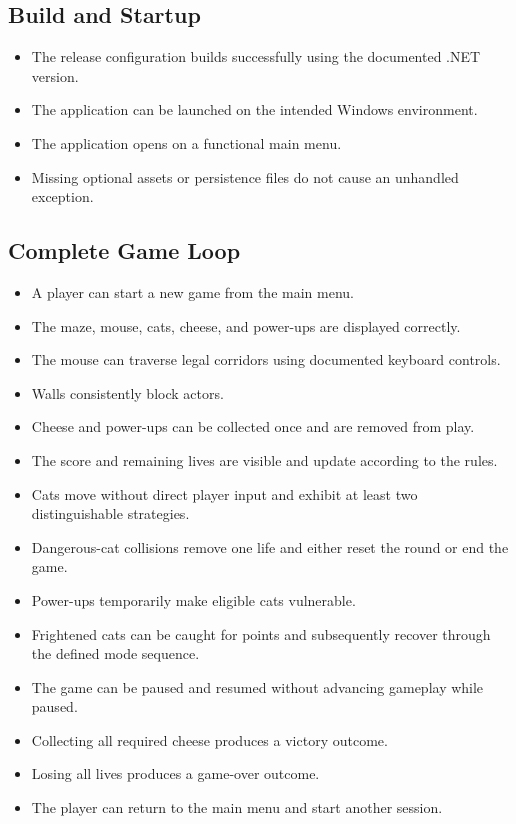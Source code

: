 \subsection{Build and Startup}

\begin{itemize}
	\item[$\square$] The release configuration builds successfully using the documented .NET version.
	\item[$\square$] The application can be launched on the intended Windows environment.
	\item[$\square$] The application opens on a functional main menu.
	\item[$\square$] Missing optional assets or persistence files do not cause an unhandled exception.
\end{itemize}

\subsection{Complete Game Loop}

\begin{itemize}
	\item[$\square$] A player can start a new game from the main menu.
	\item[$\square$] The maze, mouse, cats, cheese, and power-ups are displayed correctly.
	\item[$\square$] The mouse can traverse legal corridors using documented keyboard controls.
	\item[$\square$] Walls consistently block actors.
	\item[$\square$] Cheese and power-ups can be collected once and are removed from play.
	\item[$\square$] The score and remaining lives are visible and update according to the rules.
	\item[$\square$] Cats move without direct player input and exhibit at least two distinguishable strategies.
	\item[$\square$] Dangerous-cat collisions remove one life and either reset the round or end the game.
	\item[$\square$] Power-ups temporarily make eligible cats vulnerable.
	\item[$\square$] Frightened cats can be caught for points and subsequently recover through the defined mode sequence.
	\item[$\square$] The game can be paused and resumed without advancing gameplay while paused.
	\item[$\square$] Collecting all required cheese produces a victory outcome.
	\item[$\square$] Losing all lives produces a game-over outcome.
	\item[$\square$] The player can return to the main menu and start another session.
\end{itemize}


